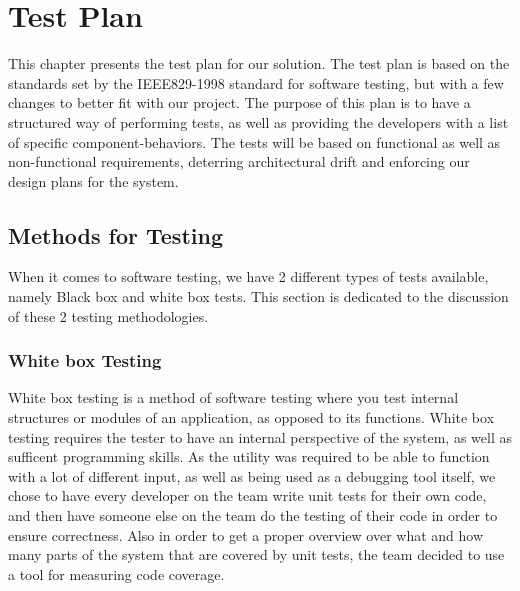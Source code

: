 \chapter{Test Plan}
This chapter presents the test plan for our solution. The test plan is based on
the standards set by the IEEE829-1998 standard for software testing, but with a
few changes to better fit with our project. The purpose of this plan is to have
a structured way of performing tests, as well as providing the developers with
a list of specific component-behaviors. The tests will be based on functional as
well as non-functional requirements, deterring architectural drift and
enforcing our design plans for the system.


\section{Methods for Testing}
When it comes to software testing, we have 2 different types of tests available, namely Black box and white box tests. This section is dedicated to the discussion of these 2 testing methodologies.


\subsection{White box Testing}
White box testing is a method of software testing where you test internal structures or modules of an application, as opposed to its functions. White box testing requires the tester to have an internal perspective of the system, as well as sufficent programming skills. As the \gls{utility} was required to be able to function with a lot of different input, as well as being used as a debugging tool itself, we chose to have every developer on the team write unit tests for their own code, and then have someone else on the team do the testing of their code in order to ensure correctness. Also in order to get a proper overview over what and how many parts of the system that are covered by unit tests, the team decided to use a tool for measuring code coverage.

